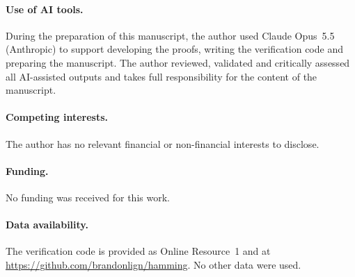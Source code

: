\documentclass[11pt]{article}
\theoremstyle{definition}
\begin{document}
\paragraph{Use of AI tools.} During the preparation of this manuscript, the author used Claude
Opus~5.5 (Anthropic) to support developing the proofs, writing the
verification code and preparing the manuscript. The author reviewed,
validated and critically assessed all AI-assisted outputs and takes full
responsibility for the content of the manuscript.

\paragraph{Competing interests.} The author has no relevant financial or non-financial
interests to disclose.

\paragraph{Funding.} No funding was received for this work.

\paragraph{Data availability.} The verification code is provided as Online
Resource~1 and at \url{https://github.com/brandonlign/hamming}. No other data
were used.
\end{document}
